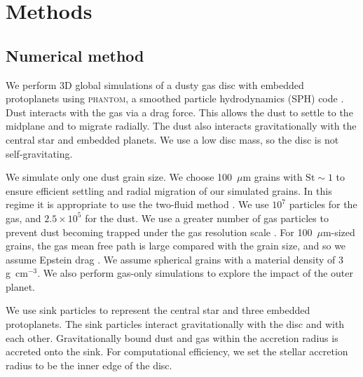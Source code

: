 \documentclass[usenatbib,a4paper,times]{mnras}
\newcommand{\st}{\mathrm{St}}
\renewcommand{\phantom}{\textsc{phantom}}
\begin{document}
\section{Methods}
\label{sec:methods}

\subsection{Numerical method}

We perform 3D global simulations of a dusty gas disc with embedded protoplanets
using \phantom{}, a smoothed particle hydrodynamics (SPH) code
\citep{price:2017}. Dust interacts with the gas via a drag force. This allows
the dust to settle to the midplane and to migrate radially. The dust also
interacts gravitationally with the central star and embedded planets. We use a
low disc mass, so the disc is not self-gravitating.

We simulate only one dust grain size. We choose 100~$\mu$m grains with
$\st{}\sim 1$ to ensure efficient settling and radial migration of our simulated
grains. In this regime it is appropriate to use the two-fluid method
\citep{laibe:2012a}. We use $10^7$ particles for the gas, and $2.5\times 10^5$
for the dust. We use a greater number of gas particles to prevent dust becoming
trapped under the gas resolution scale \citep{laibe:2012a}. For 100~$\mu$m-sized
grains, the gas mean free path is large compared with the grain size, and so we
assume Epstein drag \citet{epstein:1924}. We assume spherical grains with a
material density of $3\ $g~cm$^{-3}$. We also perform gas-only simulations to
explore the impact of the outer planet.

We use sink particles \citep{bate:1995} to represent the central star and three
embedded protoplanets. The sink particles interact gravitationally with the disc
and with each other. Gravitationally bound dust and gas within the accretion
radius is accreted onto the sink. For computational efficiency, we set the
stellar accretion radius to be the inner edge of the disc.
\end{document}
